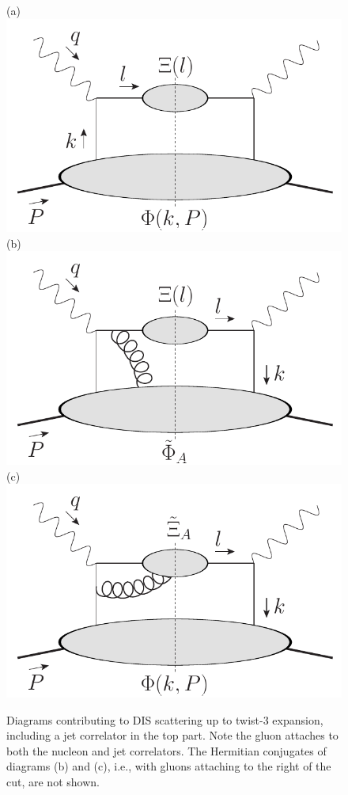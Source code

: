 \documentclass[preprintnumbers,floatfix,nofootinbib]{revtex4}
\begin{document}
\begin{figure}[bt]
  \centering
  (a)\includegraphics[width=0.3\linewidth,valign=t]{jetdiagram0}
  \hfill
  (b)\includegraphics[width=0.3\linewidth,valign=t]{jetdiagram2}
  \hfill
  (c)\includegraphics[width=0.3\linewidth,valign=t]{jetdiagram1}
  \caption{Diagrams contributing to DIS scattering up to twist-3 expansion, including a jet correlator in the top part. Note the gluon attaches to both the nucleon and jet correlators. The Hermitian conjugates of diagrams (b) and (c), i.e., with gluons attaching to the right of the cut, are not shown.
  }
  \label{fig:handbags}
\end{figure}
\end{document}
